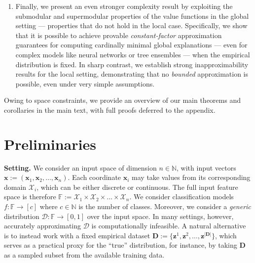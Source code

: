 \documentclass{article}
\newcommand{\x}{\textbf{x}}
\begin{document}
\begin{enumerate}
    \item Finally, we present an even stronger complexity result by exploiting the submodular and supermodular properties of the value functions in the global setting --- properties that do not hold in the local case. Specifically, we show that it is possible to achieve provable \emph{constant-factor} approximation guarantees for computing cardinally minimal global explanations --- even for complex models like neural networks or tree ensembles --- when the empirical distribution is fixed. In sharp contrast, we establish strong inapproximability results for the local setting, demonstrating that no \emph{bounded} approximation is possible, even under very simple assumptions.


\end{enumerate}

Owing to space constraints, we provide an overview of our main theorems and corollaries in the main text, with full proofs deferred to the appendix.





    

\section{Preliminaries}

\textbf{Setting.} We consider an input space of dimension $n\in\mathbb{N}$, with input vectors $\x:=(\x_1,\x_2,\ldots,\x_n)$. Each coordinate $\x_i$ may take values from its corresponding domain $\mathcal{X}_i$, which can be either discrete or continuous. The full input feature space is therefore $\mathbb{F}:=\mathcal{X}_1\times \mathcal{X}_2 \times \ldots \times \mathcal{X}_n$. We consider classification models $f:\mathbb{F}\to [c]$ where $c\in\mathbb{N}$ is the number of classes. Moreover, we consider a \emph{generic} distribution $\mathcal{D} : \mathbb{F} \to [0,1]$ over the input space. In many settings, however, accurately approximating $\mathcal{D}$ is computationally infeasible. A natural alternative is to instead work with a fixed empirical dataset $\mathbf{D} := \{\mathbf{z}^1, \mathbf{z}^2, \ldots, \mathbf{z}^{|\mathbf{D}|}\}$, which serves as a practical proxy for the ``true'' distribution, for instance, by taking $\mathbf{D}$ as a sampled subset from the available training data.
\end{document}
